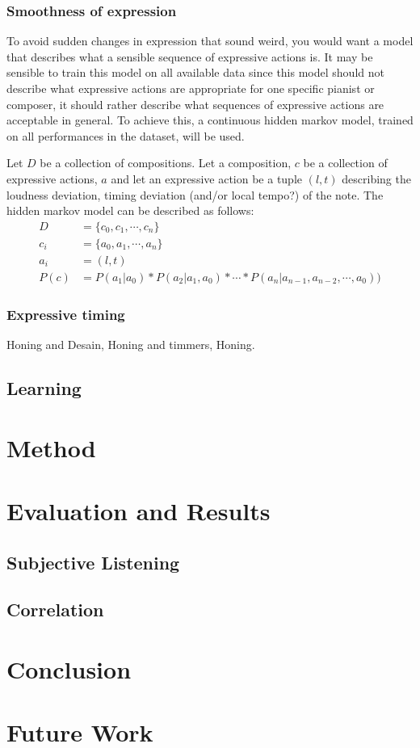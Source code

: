 \documentclass[a4paper,10pt]{article}
\begin{document}
\subsubsection{Smoothness of expression}
To avoid sudden changes in expression that sound weird, you would want a model that describes what a sensible sequence of expressive actions is. It may be sensible to train this model on all available data since this model should not describe what expressive actions are appropriate for one specific pianist or composer, it should rather describe what sequences of expressive actions are acceptable in general. To achieve this, a continuous hidden markov model, trained on all performances in the dataset, will be used.

Let $D$ be a collection of compositions. Let a composition, $c$ be a collection of expressive actions, $a$ and let an expressive action be a tuple $(l,t)$ describing the loudness deviation, timing deviation (and/or local tempo?) of the note. The hidden markov model can be described as follows:
\begin{align*}
D &= \{c_0, c_1, \cdots, c_n\}\\
c_i &= \{a_0, a_1, \cdots, a_n\}\\
a_i &= (l,t)\\
P(c) &= P(a_1 | a_0) * P(a_2|a_1, a_0) * \cdots * P(a_n|a_{n-1}, a_{n-2}, \cdots, a_0))
\end{align*}

\subsubsection{Expressive timing} Honing and Desain, Honing and timmers, Honing.
\subsection{Learning}


\section{Method}
\section{Evaluation and Results}
\subsection{Subjective Listening}
\subsection{Correlation}
\section{Conclusion}
\section{Future Work}

  
 
 
\end{document}
